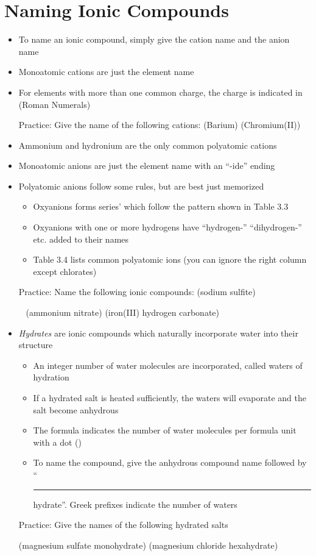 \documentclass[12pt, openany, letterpaper]{memoir}
\begin{document}
\section{Naming Ionic Compounds}
\begin{itemize}
	\item To name an ionic compound, simply give the cation name and the anion name
	\item Monoatomic cations are just the element name
	\item For elements with more than one common charge, the charge is indicated in (Roman Numerals)
	
	Practice: Give the name of the following cations:  (Barium) \hspace{1em}  (Chromium(II))
	\item Ammonium and hydronium are the only common polyatomic cations
	\item Monoatomic anions are just the element name with an ``-ide'' ending
	\item Polyatomic anions follow some rules, but are best just memorized
	\begin{itemize}
		\item Oxyanions forms series' which follow the pattern shown in Table 3.3
		\item Oxyanions with one or more hydrogens have ``hydrogen-'' ``dihydrogen-'' etc. added to their names
		\item Table 3.4 lists common polyatomic ions (you can ignore the right column except chlorates)
	\end{itemize}
	
	Practice: Name the following ionic compounds:   (sodium sulfite)
	
	~\hphantom{Practice:}  (ammonium nitrate) \hspace{1em}  (iron(III) hydrogen carbonate)
	\item \emph{Hydrates} are ionic compounds which naturally incorporate water into their structure
	\begin{itemize}
		\item An integer number of water molecules are incorporated, called waters of hydration
		\item If a hydrated salt is heated sufficiently, the waters will evaporate and the salt become anhydrous
		\item The formula indicates the number of water molecules per formula unit with a dot ()
		\item To name the compound, give the anhydrous compound name followed by ``\rule[-1mm]{1in}{.1pt} hydrate''. Greek prefixes indicate the number of waters
	\end{itemize}

	Practice: Give the names of the following hydrated salts
	
	 (magnesium sulfate monohydrate)   (magnesium chloride hexahydrate)
\end{itemize}
\end{document}
